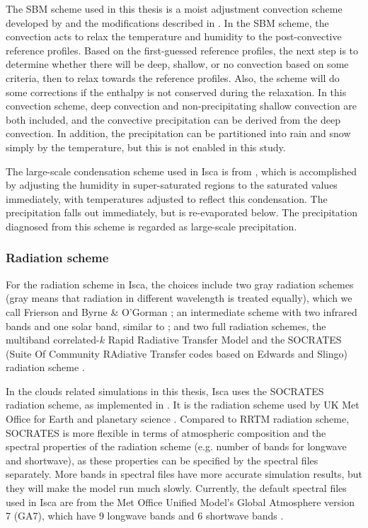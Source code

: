 The SBM scheme  used in this thesis is a moist adjustment convection scheme developed by \cite{Frierson2007} and the modifications described in \cite{OGorman2008hydrological}. In the SBM scheme, the convection acts to relax the temperature and humidity to the post-convective reference profiles. Based on the first-guessed reference profiles, the next step is to determine whether there will be deep, shallow, or no convection based on some criteria, then to relax towards the reference profiles. Also, the scheme will do some corrections if the enthalpy is not conserved during the relaxation. In this convection scheme, deep convection and non-precipitating shallow convection are both included, and the convective precipitation can be derived from the deep convection. In addition, the precipitation can be partitioned into rain and snow simply by the temperature, but this is not enabled in this study.

The large-scale condensation scheme  used in Isca is from \cite{Frierson2006}, which is accomplished by adjusting the humidity in super-saturated regions to the saturated values immediately, with temperatures adjusted to reflect this condensation. The precipitation falls out immediately, but is re-evaporated below. The precipitation diagnosed from this scheme is regarded as large-scale precipitation.

\subsubsection{Radiation scheme}

For the radiation scheme in Isca, the choices include two gray radiation schemes (gray means that radiation in different wavelength is treated equally), which we call Frierson \citep{Frierson2006} and Byrne \& O'Gorman \citep[BOG;][]{Byrne2013}; an intermediate scheme with two infrared bands and one solar band, similar to \cite{Geen2016}; and two full radiation schemes, the multiband correlated-$k$ Rapid Radiative Transfer Model \citep[RRTM;][]{Clough2005} and the SOCRATES (Suite Of Community RAdiative Transfer codes based on Edwards and Slingo) radiation scheme \citep{Edwards1996, Manners2015}. 

In the clouds related simulations in this thesis, Isca uses the SOCRATES radiation scheme, as implemented in \cite{Thomson2019}. It is the radiation scheme used by UK Met Office for Earth and planetary science \citep{Manners2015}. Compared to RRTM radiation scheme, SOCRATES is more flexible in terms of atmospheric composition and the spectral properties of the radiation scheme (e.g. number of bands for longwave and shortwave), as these properties can be specified by the spectral files separately. More bands in spectral files have more accurate simulation results, but they will make the model run much slowly. Currently, the default spectral files used in Isca are from the Met Office Unified Model's Global Atmosphere version 7 (GA7), which have 9 longwave bands and 6 shortwave bands \citep{Walters2019}.


